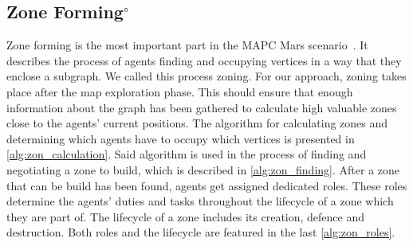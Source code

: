 \subsection[Zone Forming]{Zone Forming$^\circ$}\label{alg:zoning}
Zone forming is the most important part in the MAPC Mars scenario~\cite{ahlbrecht_mapc_2014}.%
It describes the process of agents finding and occupying vertices in a way that they enclose a subgraph.
We called this process zoning.
For our approach, zoning takes place after the map exploration phase.
This should ensure that enough information about the graph has been gathered to calculate high valuable zones close to the agents' current positions.
The algorithm for calculating zones and determining which agents have to occupy which vertices is presented in \autoref{alg:zon_calculation}.
Said algorithm is used in the process of finding and negotiating a zone to build, which is described in \autoref{alg:zon_finding}.
After a zone that can be build has been found, agents get assigned dedicated roles.
These roles determine the agents' duties and tasks throughout the lifecycle of a zone which they are part of.
The lifecycle of a zone includes its creation, defence and destruction.
Both roles and the lifecycle are featured in the last \autoref{alg:zon_roles}.




